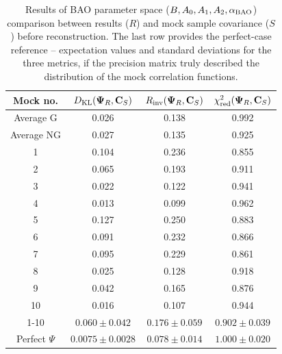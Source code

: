 \begin{table}
\centering
\begin{tabular}{|c|c|c|c|}
\hline
Mock no. & $D_{\rm KL} {\left( {\bf \Psi}_R, {\bf C}_S \right)}$ & $R_{\rm inv} {\left( {\bf \Psi}_R, {\bf C}_S \right)}$ & $\chi^2_{\rm red} {\left( {\bf \Psi}_R, {\bf C}_S \right)}$ \\
\hline
Average G & 0.026 & 0.138 & 0.992 \\
Average NG & 0.027 & 0.135 & 0.925 \\
\hline
1 & 0.104 & 0.236 & 0.855 \\
2 & 0.065 & 0.193 & 0.911 \\
3 & 0.022 & 0.122 & 0.941 \\
4 & 0.013 & 0.099 & 0.962 \\
5 & 0.127 & 0.250 & 0.883 \\
6 & 0.091 & 0.232 & 0.866 \\
7 & 0.095 & 0.229 & 0.861 \\
8 & 0.025 & 0.128 & 0.918 \\
9 & 0.042 & 0.165 & 0.876 \\
10 & 0.016 & 0.107 & 0.944 \\
\hline
1-10 & $0.060 \pm 0.042$ & $0.176 \pm 0.059$ & $0.902 \pm 0.039$ \\
\hline
Perfect $\Psi$ & $0.0075 \pm 0.0028$ & $0.078 \pm 0.014$ & $1.000 \pm 0.020$ \\
\hline
\end{tabular}
\caption[Parameter-space (for BAO model) comparison between \rascalc{} and sample covariance for \desimtwo{} mocks before reconstruction]{Results of BAO parameter space ($B, A_0, A_1, A_2, \alpha_{\rm BAO}$) comparison between \rascalc{} results ($R$) and mock sample covariance ($S$) before reconstruction.
The last row provides the perfect-case reference -- expectation values and standard deviations for the three metrics, if the \rascalc{} precision matrix truly described the distribution of the mock correlation functions.
}
\label{tab:comparison-parameter-pre}
\end{table}

